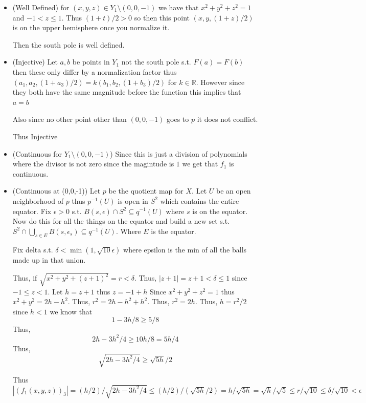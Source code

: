 \documentclass[12pt, letterpaper]{article}
\newcommand{\R}{\mathbb{R}}
\begin{document}
\begin{itemize}
    \item (Well Defined) for $(x,y,z) \in Y_1 \setminus (0,0,-1)$ we have that $x^2+y^2+z^2=1$ and $-1 < z \leq 1$. Thus $(1+t)/2 > 0$ so then this point $(x,y,(1+z)/2)$ is on the upper hemisphere once you normalize it.
    
    Then the south pole is well defined.
    
    \item (Injective) Let $a,b$ be points in $Y_1$ not the south pole s.t. $F(a)=F(b)$ then these only differ by a normalization factor thus $(a_1,a_2,(1+a_3)/2)=k(b_1,b_2,(1+b_3)/2)$ for $k \in \R$. However since they both have the same magnitude before the function this implies that $a=b$
    
    Also since no other point other than $(0,0,-1)$ goes to $p$ it does not conflict.

    Thus Injective

    \item (Continuous for $Y_1 \setminus (0,0,-1)$) Since this is just a division of polynomials where the divisor is not zero since the magintude is $1$ we get that $f_1$ is continuous.
    
    \item (Continuous at (0,0,-1)) Let $p$ be the quotient map for $X$. Let $U$ be an open neighborhood of $p$ thus $p^{-1}(U)$ is open in $S^2$ which contains the entire equator. Fix $\epsilon >0$ s.t. $B(s,\epsilon) \cap S^2 \subseteq q^{-1}(U)$ where $s$ is on the equator. Now do this for all the things on the equator and build a new set s.t. $S^2 \cap \bigcup_{s \in E} B(s, \epsilon_s) \subseteq q^{-1}(U)$. Where $E$ is the equator.
    
    Fix delta s.t. $\delta < \min(1,\sqrt{10}\epsilon)$ where epsilon is the min of all the balls made up in that union. 

    Thus, if $\sqrt{x^2+y^2+(z+1)^2}=r < \delta$. Thus, $|z+1|=z+1 < \delta \leq 1$ since $-1 \leq z < 1$. Let $h=z+1$ thus $z=-1+h$ Since $x^2+y^2+z^2=1$ thus $x^2+y^2=2h-h^2$. Thus, $r^2=2h-h^2+h^2$. Thus, $r^2=2h$. Thus, $h=r^2/2$ since $h < 1$ we know that
    \[1-3h/8 \geq 5/8\]
    Thus,
    \[2h-3h^2/4 \geq 10h/8=5h/4\]
    Thus,
    \[\sqrt{2h-3h^2/4} \geq \sqrt{5h}/2\]

    Thus $|(f_1(x,y,z))_3|=(h/2)/\sqrt{2h-3h^2/4} \leq (h/2)/(\sqrt{5h}/2)=h/\sqrt{5h}=\sqrt{h}/\sqrt{5} \leq r/\sqrt{10} \leq \delta/\sqrt{10} < \epsilon$


\end{itemize}
\end{document}
